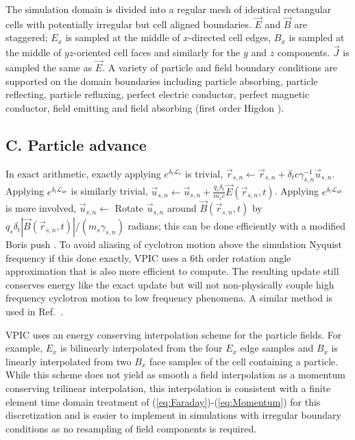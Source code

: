 \documentclass[aps,prl,preprint,preprintnumbers,groupedaddress]{revtex4}
\newcommand{\vecr}{\vec{r}}
\newcommand{\vecu}{\vec{u}}
\newcommand{\vecJ}{\vec{J}}
\newcommand{\vecE}{\vec{E}}
\newcommand{\vecB}{\vec{B}}
\newcommand{\op}{\mathcal{L}}
\newcommand{\eq}[1]{(\ref{eq:#1})}
\begin{document}
The simulation domain is divided into a regular mesh of identical
rectangular cells with potentially irregular but cell aligned
boundaries.  $\vecE$ and $\vecB$ are staggered; $E_x$ is sampled at
the middle of $x$-directed cell edges, $B_x$ is sampled at the middle
of $yz$-oriented cell faces and similarly for the $y$ and $z$
components.  $\vecJ$ is sampled the same as $\vecE$.  A variety of
particle and field boundary conditions are supported on the domain
boundaries including particle absorbing, particle reflecting, particle
refluxing, perfect electric conductor, perfect magnetic conductor,
field emitting and field absorbing (first order Higdon
\cite{Higdon_1986}).

\subsection{C. Particle advance}

In exact arithmetic, exactly applying $e^{\delta_t\op_r}$ is trivial,
$\vecr_{s,n} \leftarrow \vecr_{s,n} + \delta_t
c\gamma_{s,n}^{-1}\vecu_{s,n}$.  Applying $e^{\delta_t\op_{ue}}$ is
similarly trivial, $\vecu_{s,n}\leftarrow\vecu_{s,n} +
\frac{q_s\delta_t}{m_s c}\vecE\left(\vecr_{s,n},t\right)$.
Applying $e^{\delta_t\op_{ub}}$ is more involved, $\vecu_{s,n}
\leftarrow$ Rotate $\vecu_{s,n}$ around
$\vecB\left(\vecr_{s,n},t\right)$ by
$q_s\delta_t\left|\vecB\left(\vecr_{s,n},t\right)\right| /
\left(m_s\gamma_{s,n}\right)$ radians; this can be done efficiently
with a modified Boris push \cite{Boris_1970}.  To avoid aliasing of
cyclotron motion above the simulation Nyquist frequency if this done
exactly, VPIC uses a 6th order rotation angle approximation that is
also more efficient to compute.  The resulting update still conserves
energy like the exact update but will not non-physically couple high
frequency cyclotron motion to low frequency phenomena.  A similar
method is used in Ref.~\cite{Blahovec_et_al_2000}.

VPIC uses an energy conserving interpolation scheme for the particle
fields.  For example, $E_x$ is bilinearly interpolated from the four
$E_x$ edge samples and $B_x$ is linearly interpolated from two $B_x$
face samples of the cell containing a particle.  While this scheme
does not yield as smooth a field interpolation as a momentum
conserving trilinear interpolation, this interpolation is consistent
with a finite element time domain treatment of
\eq{Faraday}-\eq{Momentum} for this discretization
\cite{Eastwood_et_al_1995} and is easier to implement in simulations
with irregular boundary conditions as no resampling of field
components is required.
\end{document}
